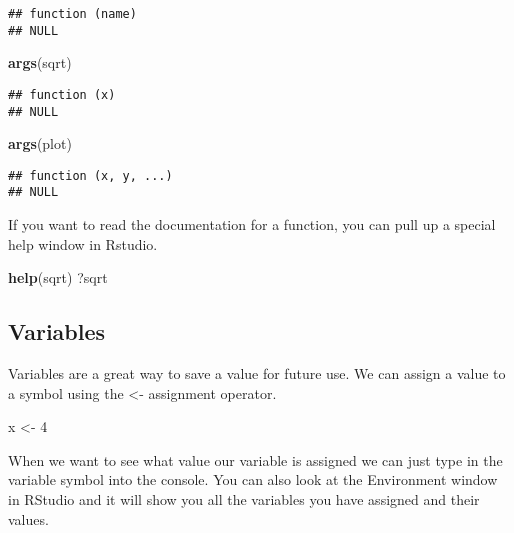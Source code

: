 \documentclass[]{article}
\newenvironment{Shaded}{\begin{snugshade}}{\end{snugshade}}
\newcommand{\KeywordTok}[1]{\textcolor[rgb]{0.13,0.29,0.53}{\textbf{#1}}}
\newcommand{\DecValTok}[1]{\textcolor[rgb]{0.00,0.00,0.81}{#1}}
\newcommand{\StringTok}[1]{\textcolor[rgb]{0.31,0.60,0.02}{#1}}
\newcommand{\NormalTok}[1]{#1}
\begin{document}
\begin{verbatim}
## function (name) 
## NULL
\end{verbatim}

\begin{Shaded}
\begin{Highlighting}[]
\KeywordTok{args}\NormalTok{(sqrt)}
\end{Highlighting}
\end{Shaded}

\begin{verbatim}
## function (x) 
## NULL
\end{verbatim}

\begin{Shaded}
\begin{Highlighting}[]
\KeywordTok{args}\NormalTok{(plot)}
\end{Highlighting}
\end{Shaded}

\begin{verbatim}
## function (x, y, ...) 
## NULL
\end{verbatim}

If you want to read the documentation for a function, you can pull up a
special help window in Rstudio.

\begin{Shaded}
\begin{Highlighting}[]
\KeywordTok{help}\NormalTok{(sqrt)}
\NormalTok{?sqrt}
\end{Highlighting}
\end{Shaded}

\subsection{Variables}\label{variables}

Variables are a great way to save a value for future use. We can assign
a value to a symbol using the \textless{}- assignment operator.

\begin{Shaded}
\begin{Highlighting}[]
\NormalTok{x <-}\StringTok{ }\DecValTok{4}
\end{Highlighting}
\end{Shaded}

When we want to see what value our variable is assigned we can just type
in the variable symbol into the console. You can also look at the
Environment window in RStudio and it will show you all the variables you
have assigned and their values.
\end{document}
